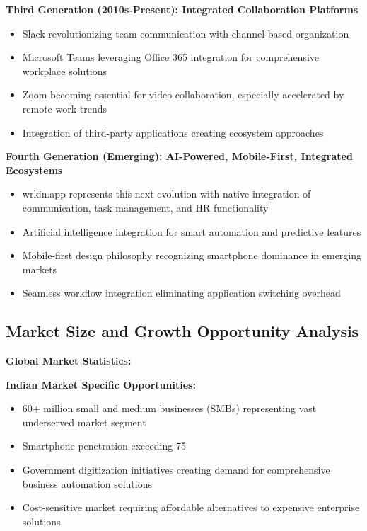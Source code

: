 \textbf{Third Generation (2010s-Present): Integrated Collaboration Platforms}
\begin{itemize}
    \item Slack revolutionizing team communication with channel-based organization
    \item Microsoft Teams leveraging Office 365 integration for comprehensive workplace solutions
    \item Zoom becoming essential for video collaboration, especially accelerated by remote work trends
    \item Integration of third-party applications creating ecosystem approaches
\end{itemize}

\textbf{Fourth Generation (Emerging): AI-Powered, Mobile-First, Integrated Ecosystems}
\begin{itemize}
    \item wrkin.app represents this next evolution with native integration of communication, task management, and HR functionality
    \item Artificial intelligence integration for smart automation and predictive features
    \item Mobile-first design philosophy recognizing smartphone dominance in emerging markets
    \item Seamless workflow integration eliminating application switching overhead
\end{itemize}

\subsection{Market Size and Growth Opportunity Analysis}

\textbf{Global Market Statistics:}

\textbf{Indian Market Specific Opportunities:}
\begin{itemize}
    \item 60+ million small and medium businesses (SMBs) representing vast underserved market segment
    \item Smartphone penetration exceeding 75%
    \item Government digitization initiatives creating demand for comprehensive business automation solutions
    \item Cost-sensitive market requiring affordable alternatives to expensive enterprise solutions
\end{itemize}

